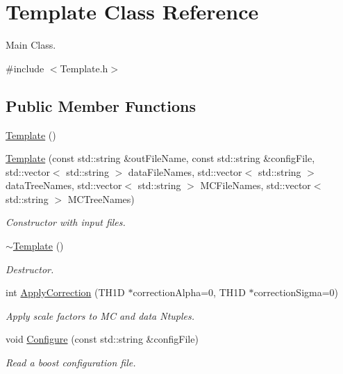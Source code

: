 \hypertarget{classTemplateMethod_1_1Template}{\section{Template Class Reference}
\label{classTemplateMethod_1_1Template}
}


Main Class.  




{\ttfamily \#include $<$Template.\+h$>$}

\subsection*{Public Member Functions}
\begin{DoxyCompactItemize}
\item 
\hyperlink{classTemplateMethod_1_1Template_a1142fb197e62bc0a785ea961c4dae4b4}{Template} ()
\item 
\hyperlink{classTemplateMethod_1_1Template_af72bac26d33db55d6eb72426034410b8}{Template} (const std\+::string \&out\+File\+Name, const std\+::string \&config\+File, std\+::vector$<$ std\+::string $>$ data\+File\+Names, std\+::vector$<$ std\+::string $>$ data\+Tree\+Names, std\+::vector$<$ std\+::string $>$ M\+C\+File\+Names, std\+::vector$<$ std\+::string $>$ M\+C\+Tree\+Names)
\begin{DoxyCompactList}\small\item\em Constructor with input files. \end{DoxyCompactList}\item 
\hyperlink{classTemplateMethod_1_1Template_a07eafd812c7549572c4ef2c853113ea0}{$\sim$\+Template} ()
\begin{DoxyCompactList}\small\item\em Destructor. \end{DoxyCompactList}\item 
int \hyperlink{classTemplateMethod_1_1Template_af7a98edbce0b7dde939d43ca4b82f9cd}{Apply\+Correction} (T\+H1\+D $\ast$correction\+Alpha=0, T\+H1\+D $\ast$correction\+Sigma=0)
\begin{DoxyCompactList}\small\item\em Apply scale factors to M\+C and data Ntuples. \end{DoxyCompactList}\item 
void \hyperlink{classTemplateMethod_1_1Template_a4b28b338179a078008e9557d1db2424f}{Configure} (const std\+::string \&config\+File)
\begin{DoxyCompactList}\small\item\em Read a boost configuration file. \end{DoxyCompactList}\item 

\end{DoxyCompactItemize}
